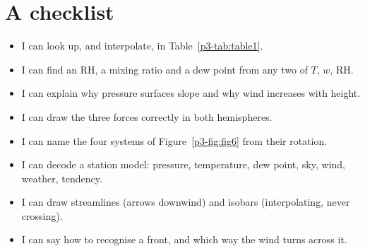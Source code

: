 \section{A checklist}\label{p3-sec:checklist}

\begin{itemize}[label=$\square$]
\item I can look up, and interpolate, in Table~\ref{p3-tab:table1}.
\item I can find an RH, a mixing ratio and a dew point from any two of $T$, $w$, RH.
\item I can explain why pressure surfaces slope and why wind increases with height.
\item I can draw the three forces correctly in both hemispheres.
\item I can name the four systems of Figure~\ref{p3-fig:fig6} from their rotation.
\item I can decode a station model: pressure, temperature, dew point, sky, wind, weather, tendency.
\item I can draw streamlines (arrows downwind) and isobars (interpolating, never crossing).
\item I can say how to recognise a front, and which way the wind turns across it.
\end{itemize}
